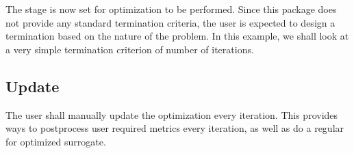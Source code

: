 \documentclass[letterpaper,12pt,english]{sphinxmanual}
\begin{document}
\begin{sphinxVerbatim}[commandchars=\\\{\}]
  
                   
                                            
\end{sphinxVerbatim}

\sphinxAtStartPar
The stage is now set for optimization to be performed. Since this package does not provide any standard termination criteria,
the user is expected to design a termination based on the nature of the problem. In this example, we shall look at
a very simple termination criterion of number of iterations.

\begin{sphinxVerbatim}[commandchars=\\\{\}]
  
\end{sphinxVerbatim}


\subsection{Update}
\label{\detokenize{examples/getting_started_example:update}}
\sphinxAtStartPar
The user shall manually update the optimization every iteration. This provides ways to post\sphinxhyphen{}process user required metrics
every iteration, as well as do a regular  for optimized surrogate.

\begin{sphinxVerbatim}[commandchars=\\\{\}]
   
\end{sphinxVerbatim}
\end{document}

